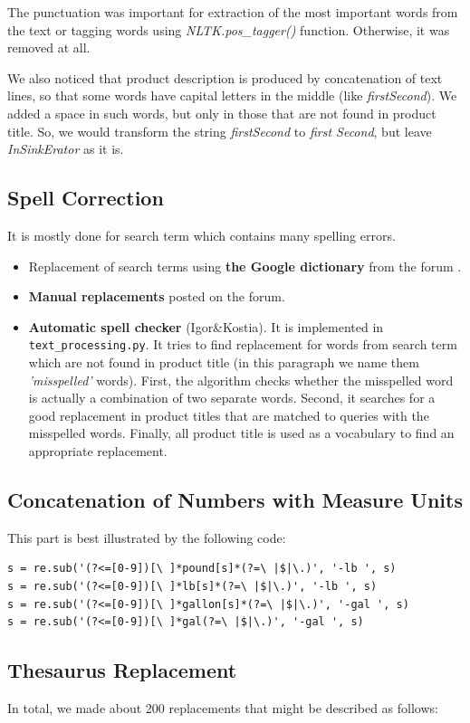 \documentclass[12pt]{article}
\begin{document}
The punctuation was important for extraction of the most important words from the text or tagging words using \emph{NLTK.pos\_tagger()} function. Otherwise, it was removed at all.

We also noticed that product description is produced by concatenation of text lines, so that some words have capital letters in the middle (like \emph{firstSecond}). We added a space in such words, but only in those that are not found in product title. So, we would transform the string \emph{firstSecond} to \emph{first Second}, but leave \emph{InSinkErator} as it is.

\subsection{Spell Correction}
It is mostly done for search term which contains many spelling errors.
\begin{itemize}
\item Replacement of search terms using \textbf{the Google dictionary} from the forum  \cite{Google_dict}.
\item \textbf{Manual replacements} posted on the forum.
\item \textbf{Automatic spell checker} (Igor\&Kostia). It is implemented in \texttt{text\_processing.py}. It tries to find replacement for words from search term which are not found in product title (in this paragraph we name them \emph{'misspelled'} words). First, the algorithm checks whether the misspelled word is actually a combination of two separate words. Second, it searches for a good replacement in product titles that are matched to queries with the misspelled words. Finally, all product title is used as a vocabulary to find an appropriate replacement.
\end{itemize}


\subsection{Concatenation of Numbers with Measure Units}
This part is best illustrated by the following code:

\begin{verbatim}
s = re.sub('(?<=[0-9])[\ ]*pound[s]*(?=\ |$|\.)', '-lb ', s)
s = re.sub('(?<=[0-9])[\ ]*lb[s]*(?=\ |$|\.)', '-lb ', s)
s = re.sub('(?<=[0-9])[\ ]*gallon[s]*(?=\ |$|\.)', '-gal ', s)
s = re.sub('(?<=[0-9])[\ ]*gal(?=\ |$|\.)', '-gal ', s)
\end{verbatim}


\subsection{Thesaurus Replacement}
In total, we made about 200 replacements that might be described as follows:
\end{document}
